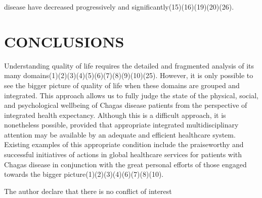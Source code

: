  disease have decreased progressively and significantly(15)(16)(19)(20)(26). \section*{CONCLUSIONS}\par Understanding quality of life requires the detailed and fragmented analysis of its many
 domains(1)(2)(3)(4)(5)(6)(7)(8)(9)(10)(25). However, it is only possible to see the
 bigger picture of quality of life when these domains are grouped and integrated. This
 approach allows us to fully judge the state of the physical, social, and psychological
 wellbeing of Chagas disease patients from the perspective of integrated health
 expectancy. Although this is a difficult approach, it is nonetheless possible, provided
 that appropriate integrated multidisciplinary attention may be available by an adequate
 and efficient healthcare system. Existing examples of this appropriate condition include
 the praiseworthy and successful initiatives of actions in global healthcare services for
 patients with Chagas disease in conjunction with the great personal efforts of those
 engaged towards the bigger picture(1)(2)(3)(4)(6)(7)(8)(10).

{The author declare that there is no conflict of interest}
\balance



